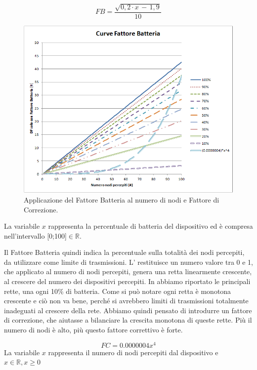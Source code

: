 \begin{equation}
	\label{eq:df_FB}
	FB = \dfrac{\sqrt{0,2\cdot x\,-\,1,9}}{10}
\end{equation}
\begin{figure}[tb]
	\centering
	\includegraphics[width=0.9\linewidth]{Images/grafici_usati/DF_curve_fattore_batteria_corr}
	\caption[Curve Fattore Batteria con Fattore di Correzione]{Applicazione del Fattore Batteria al numero di nodi e Fattore di Correzione.}
	\label{fig:DF_curve_fattore_batteria_corr}
\end{figure}
La variabile $\textit{x}$ rappresenta la percentuale di batteria del dispositivo ed è compresa nell'intervallo [0;100]$\in\mathbb{R}$.

Il Fattore Batteria quindi indica la percentuale sulla totalità dei nodi percepiti, da utilizzare come limite di trasmissioni. L' restituisce un numero valore tra 0 e 1, che applicato al numero di nodi percepiti, genera una retta linearmente crescente, al crescere del numero dei dispositivi percepiti. In  abbiamo riportato le principali rette, una ogni 10\% di batteria. Come si può notare ogni retta è monotona crescente e ciò non va bene, perché si avrebbero limiti di trasmissioni totalmente inadeguati al crescere della rete. Abbiamo quindi pensato di introdurre un fattore di correzione, che aiutasse a bilanciare la crescita monotona di queste rette. Più il numero di nodi è alto, più questo fattore correttivo è forte.
\medskip

\begin{equation}
	\label{eq:df_FC}
	FC = 0.0000004x^4
\end{equation}
La variabile $\textit{x}$ rappresenta il numero di nodi percepiti dal dispositivo e $ \textit{x}\in\mathbb{R},x\geq0$

